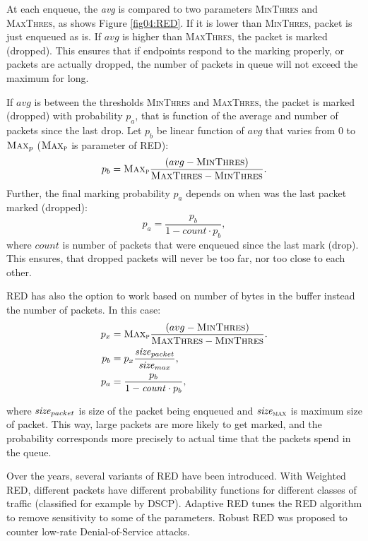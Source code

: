 At each enqueue, the \emph{avg} is compared to two parameters \textsc{MinThres} and \textsc{MaxThres}, as shows Figure \ref{fig04:RED}. If it is lower than \textsc{MinThres}, packet is just enqueued as is. If $avg$ is higher than \textsc{MaxThres}, the packet is marked (dropped). This ensures that if endpoints respond to the marking properly, or packets are actually dropped, the number of packets in queue will not exceed the maximum for long.

If $avg$ is between the thresholds \textsc{MinThres} and \textsc{MaxThres}, the packet is marked (dropped) with probability $p_a$, that is function of the average and number of packets since the last drop. Let $p_b$ be linear function of $avg$ that varies from 0 to $\textsc{Max}_p$ ($\textsc{Max}_\textsc{p}$ is parameter of RED):
\[
  p_b = \textsc{Max}_\textsc{p} \frac{(avg - \textsc{MinThres})}{\textsc{MaxThres} - \textsc{MinThres}}.
\]
Further, the final marking probability $p_a$ depends on when was the last packet marked (dropped):
\[
p_a = \frac{p_b}{1-count \cdot p_b},
\]
where $count$ is number of packets that were enqueued since the last mark (drop). This ensures, that dropped packets will never be too far, nor too close to each other\cite[Section 7]{Floyd:1993:RED:169931.169935}.

RED has also the option to work based on number of bytes in the buffer instead the number of packets. In this case:
\begin{align*}
p_x &= \textsc{Max}_\textsc{p} \frac{(avg - \textsc{MinThres})}{\textsc{MaxThres} - \textsc{MinThres}}.\\
p_b &= p_x \frac{\text{\emph{size}}_{packet}}{\text{\emph{size}}_{max}},\\
p_a &= \frac{p_b}{1-\text{\emph{count}} \cdot p_b},
\end{align*}

where $\text{\emph{size}}_{packet}$ is size of the packet being enqueued and $\text{\emph{size}}_{\textsc{max}}$ is maximum size of packet. This way, large packets are more likely to get marked, and the probability corresponds more precisely to actual time that the packets spend in the queue.

Over the years, several variants of RED have been introduced. With Weighted RED, different packets have different probability functions for different classes of traffic (classified for example by DSCP). Adaptive RED \cite{Floyd01adaptivered:} tunes the RED algorithm to remove sensitivity to some of the parameters. Robust RED \cite{RRED} was proposed to counter low-rate Denial-of-Service attacks.


